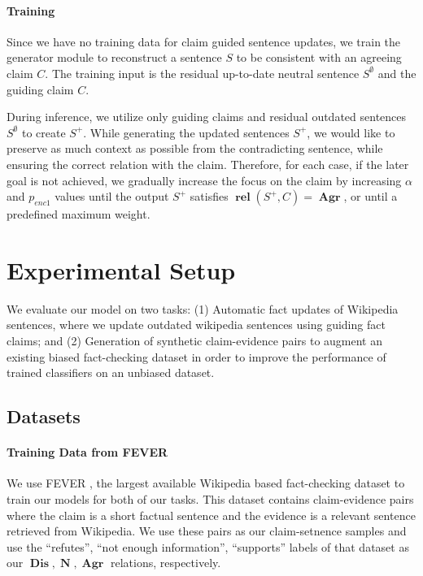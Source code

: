 \documentclass[letterpaper]{article}
\DeclareMathOperator{\rel}{\boldsymbol{rel}}
\DeclareMathOperator{\A}{\boldsymbol{Agr}}
\DeclareMathOperator{\D}{\boldsymbol{Dis}}
\DeclareMathOperator{\N}{\boldsymbol{N}}
\begin{document}
\paragraph{Training}

Since we have no training data for claim guided sentence updates, we train the generator module to reconstruct a sentence $S$ to be consistent with an agreeing claim $C$. The training input is the residual up-to-date neutral sentence $S^{\emptyset}$ and the guiding claim $C$.

During inference, we utilize only guiding claims and residual outdated sentences $S^{\emptyset}$ to create $S^+$. While generating the updated sentences $S^+$, we would like to preserve as much context as possible from the contradicting sentence, while ensuring the correct relation with the claim. Therefore, for each case, if the later goal is not achieved, we gradually increase the focus on the claim by increasing $\alpha$ and $p_{enc1}$ values until the output $S^+$ satisfies $\rel(S^+,C)=\A$, or until a predefined maximum weight.



\section{Experimental Setup}
\label{sec:experiments}
We evaluate our model on two tasks: (1) Automatic fact updates of Wikipedia sentences, where we update outdated wikipedia sentences using guiding fact claims; and (2) Generation of synthetic claim-evidence pairs to augment an existing biased fact-checking dataset in order to improve the performance of trained classifiers on an unbiased dataset.

\subsection{Datasets}


\paragraph{Training Data from FEVER}
We use FEVER \cite{fever}, the largest available Wikipedia based fact-checking dataset to train our models for both of our tasks. This dataset contains claim-evidence pairs where the claim is a short factual sentence and the evidence is a relevant sentence retrieved from Wikipedia.
We use these pairs as our claim-setnence samples and use the ``refutes'', ``not enough information'', ``supports'' labels of that dataset as our $\D, \N, \A$ relations, respectively.
\end{document}
